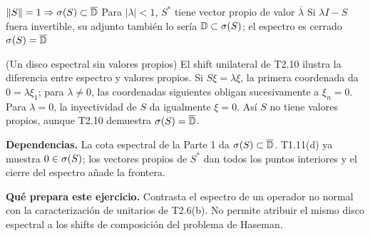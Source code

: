 \proofdiagrambranch
{$\|S\|=1\Rightarrow\sigma(S)\subset\overline{\mathbb D}$}
{Para $|\lambda|<1$, $S^*$ tiene vector propio de valor $\overline\lambda$}
{Si $\lambda I-S$ fuera invertible, su adjunto también lo sería}
{$\mathbb D\subset\sigma(S)$; el espectro es cerrado}
{$\sigma(S)=\overline{\mathbb D}$}

\begin{cthejemplo}{(Un disco espectral sin valores propios)}
El shift unilateral de T2.10 ilustra la diferencia entre espectro y valores propios.
Si $S\xi=\lambda\xi$, la primera coordenada da $0=\lambda\xi_1$; para
$\lambda\ne0$, las coordenadas siguientes obligan sucesivamente a $\xi_n=0$.
Para $\lambda=0$, la inyectividad de $S$ da igualmente $\xi=0$.
Así $S$ no tiene valores propios, aunque T2.10 demuestra
$\sigma(S)=\overline{\mathbb D}$.
\end{cthejemplo}

\noindent\textbf{Dependencias.} La cota espectral de la Parte 1 da $\sigma(S)\subset\overline{\mathbb D}$. T1.11(d) ya muestra $0\in\sigma(S)$; los vectores propios de $S^*$ dan todos los puntos interiores y el cierre del espectro añade la frontera.

\noindent\textbf{Qué prepara este ejercicio.} Contrasta el espectro de un operador no normal con la caracterización de unitarios de T2.6(b). No permite atribuir el mismo disco espectral a los shifts de composición del problema de Haseman.
